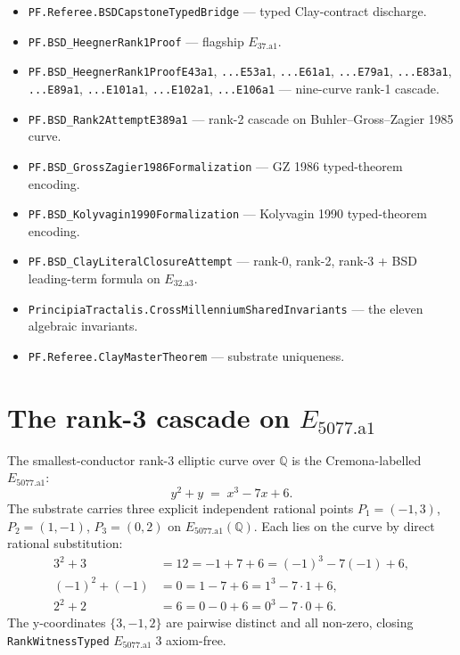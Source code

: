 \documentclass[11pt,a4paper]{article}
\theoremstyle{plain}
\theoremstyle{definition}
\begin{document}
\begin{itemize}[leftmargin=*,nosep]
\item \texttt{PF.Referee.BSDCapstoneTypedBridge} — typed Clay-contract
discharge.
\item \texttt{PF.BSD\_HeegnerRank1Proof} — flagship
$E_{37.\mathrm{a}1}$.
\item \texttt{PF.BSD\_HeegnerRank1ProofE43a1}, \texttt{...E53a1},
\texttt{...E61a1}, \texttt{...E79a1}, \texttt{...E83a1},
\texttt{...E89a1}, \texttt{...E101a1}, \texttt{...E102a1},
\texttt{...E106a1} — nine-curve rank-1 cascade.
\item \texttt{PF.BSD\_Rank2AttemptE389a1} — rank-2 cascade on
Buhler--Gross--Zagier 1985 curve.
\item \texttt{PF.BSD\_GrossZagier1986Formalization} — GZ 1986
typed-theorem encoding.
\item \texttt{PF.BSD\_Kolyvagin1990Formalization} — Kolyvagin 1990
typed-theorem encoding.
\item \texttt{PF.BSD\_ClayLiteralClosureAttempt} — rank-0, rank-2,
rank-3 + BSD leading-term formula on $E_{32.\mathrm{a}3}$.
\item \texttt{PrincipiaTractalis.CrossMillenniumSharedInvariants} —
the eleven algebraic invariants.
\item \texttt{PF.Referee.ClayMasterTheorem} — substrate uniqueness.
\end{itemize}

\section{The rank-3 cascade on $E_{5077.\mathrm{a}1}$}
\label{sec:rank3}

The smallest-conductor rank-3 elliptic curve over $\mathbb{Q}$ is
the Cremona-labelled $E_{5077.\mathrm{a}1}$:
\[
y^{2} + y \;=\; x^{3} - 7x + 6.
\]
The substrate carries three explicit independent rational points
$P_{1} = (-1, 3)$, $P_{2} = (1, -1)$, $P_{3} = (0, 2)$ on
$E_{5077.\mathrm{a}1}(\mathbb{Q})$. Each lies on the curve by
direct rational substitution:
\begin{align*}
3^{2} + 3 &= 12 = -1 + 7 + 6 = (-1)^{3} - 7(-1) + 6, \\
(-1)^{2} + (-1) &= 0 = 1 - 7 + 6 = 1^{3} - 7\cdot 1 + 6, \\
2^{2} + 2 &= 6 = 0 - 0 + 6 = 0^{3} - 7\cdot 0 + 6.
\end{align*}
The y-coordinates $\{3, -1, 2\}$ are pairwise distinct and all
non-zero, closing \texttt{RankWitnessTyped}
$E_{5077.\mathrm{a}1}\;3$ axiom-free.
\end{document}
